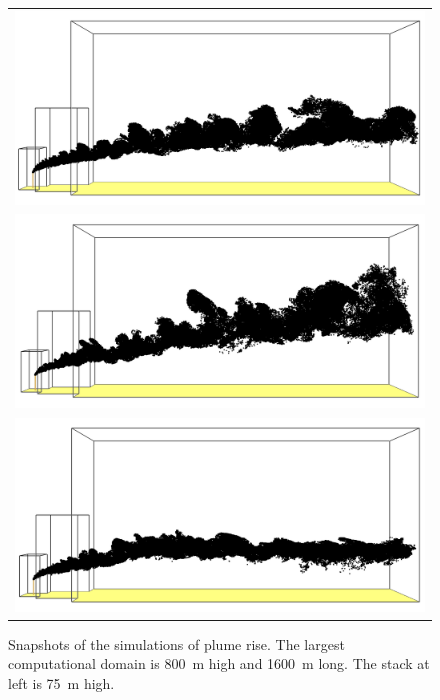 \begin{figure}[p]
\begin{center}
\begin{tabular}{c}
\includegraphics[width=6.0in]{FIGURES/Atmospheric_Dispersion/plume_rise_1_1000} \\
\includegraphics[width=6.0in]{FIGURES/Atmospheric_Dispersion/plume_rise_2_1000} \\
\includegraphics[width=6.0in]{FIGURES/Atmospheric_Dispersion/plume_rise_3_1000}
\end{tabular}
\end{center}
\caption[Images of Plume Height simulations]{Snapshots of the simulations of plume rise. The largest computational domain is 800~m high and 1600~m long. The stack at left is 75~m high.}
\label{plume_height_images}
\end{figure}

